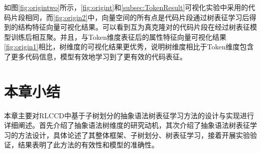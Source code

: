 如图\ref{fig:origintwo}所示，\ref{fig:origint}和\ref{subsec:TokenResult}可视化实验中采用的代码片段相同，而\ref{fig:origin2}中，向量空间的所有点是代码片段通过树表征学习后得到的结构特征向量可视化结果。可以看到互为真克隆对的代码片段在经过树表征模型训练后相互聚。并且，与Token维度表征后的属性特征向量可视化结果\ref{fig:origin1}相比，树维度的可视化结果更优秀，说明树维度相比于Token维度包含了更多代码信息，模型有效地学习到了更有效的代码表征。


\section{本章小结}
\label{sec:Summary4}
本章主要对RLCCD中基于子树划分的抽象语法树表征学习方法的设计与实现进行详细阐述。首先介绍了抽象语法树维度的研究动机，其次介绍了抽象语法树表征学习的方法设计，具体论述了其整体框架、子树划分、树表征学习，接着开展实验验证，结果表明了此方法的有效性和模型的准确性。



